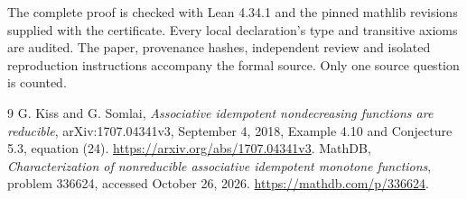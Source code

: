 \documentclass[11pt]{article}
\begin{document}
The complete proof is checked with Lean 4.34.1 and the pinned mathlib
revisions supplied with the certificate. Every local declaration's type
and transitive axioms are audited. The paper, provenance hashes,
independent review and isolated reproduction instructions accompany the
formal source. Only one source question is counted.
\begin{thebibliography}{9}
 G. Kiss and G. Somlai, \emph{Associative idempotent nondecreasing
functions are reducible}, arXiv:1707.04341v3, September 4, 2018, Example 4.10
and Conjecture 5.3, equation (24).
\url{https://arxiv.org/abs/1707.04341v3}.
 MathDB, \emph{Characterization of nonreducible associative
idempotent monotone functions}, problem 336624, accessed October 26, 2026.
\url{https://mathdb.com/p/336624}.
\end{thebibliography}
\end{document}
